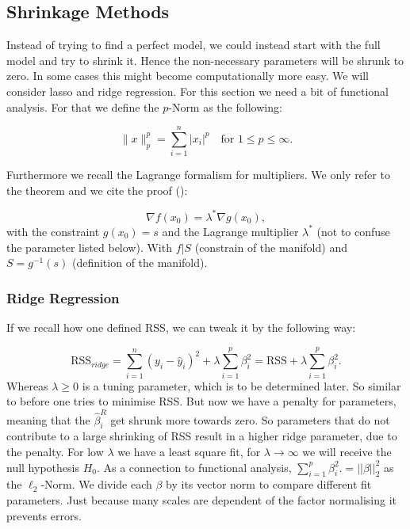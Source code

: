 \documentclass{article}
\begin{document}
\subsection{Shrinkage Methods}
 Instead of trying to find a perfect model, we could instead start with the full model and try to shrink it. Hence the non-necessary parameters will be shrunk to zero. In some cases this might become computationally more easy. We will consider lasso and ridge regression. For this section we need a bit of functional analysis. For that we define the $p$-Norm as the following:
 
 \begin{equation}
     \|x\|_p^p = \sum_{i=1}^n |x_i|^p  \quad \text{for $1 \leq p \leq \infty$}.
 \end{equation}
 
Furthermore we recall the Lagrange formalism for multipliers. We only refer to
the theorem and we cite the proof (\cite[page 414]{marsden1993elementary}):

\begin{equation}
    \nabla f(x_0) = \lambda ^* \nabla g(x_0),
\end{equation}
 with the constraint $g(x_0)=s$ and the Lagrange multiplier $\lambda ^*$ (not to confuse the parameter listed below). With $f|S$ (constrain of the manifold) and $S=g^{-1}(s)$ (definition of the manifold). 
 
 \subsubsection{Ridge Regression}
 If we recall how one defined RSS, we can tweak it by the following way:
 
\begin{equation}
     \text{RSS}_{ridge} =  \sum _ {i=1}^n (y_i-\hat{y}_i)^2 + \lambda \sum_{i=1}^p \beta_i^2 = \text{RSS} + \lambda \sum_{i=1}^p \beta_i^2.
\end{equation}
 Whereas $\lambda \geqslant 0$ is a tuning parameter, which is to be determined later. So similar to before one tries to minimise RSS. But now we have a penalty for parameters, meaning that the $\hat{\beta}_i^R$ get shrunk more towards zero. So parameters that do not contribute to a large shrinking of RSS result in a higher ridge parameter, due to the penalty. 
 For low $\lambda$ we have a least square fit, for $\lambda \to \infty$ we will receive the null hypothesis $H_0$.
 As a connection to functional analysis, $\sum_{i=1}^p \beta_i^2. = ||\beta||_{2}^2$ as the $\ell_2$-Norm. We divide each $\beta$ by its vector norm to compare different fit parameters. Just because many scales are dependent of the factor normalising it prevents errors. 
 
\end{document}
